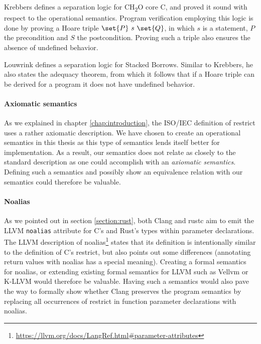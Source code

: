 Krebbers \cite{krebbers2015c} defines a separation logic for CH\textsubscript{2}O core C,
and proved it sound with respect to the operational semantics.
Program verification employing this logic is done by proving a Hoare triple $\set{P} \ s \ \set{Q}$,
in which $s$ is a statement, $P$ the precondition and $S$ the postcondition.
Proving such a triple also ensures the absence of undefined behavior.


Louwrink \cite{louwrink2021separation} defines a separation logic for Stacked Borrows. 
Similar to Krebbers, he also states the adequacy theorem, from which it follows that if a Hoare triple can be derived
for a program it does not have undefined behavior.

\paragraph{Axiomatic semantics} As we explained in chapter \ref{chap:introduction}, the
ISO/IEC definition of restrict uses a rather axiomatic description.
We have chosen to create an operational semantics in this thesis as this type of semantics
lends itself better for implementation.
As a result, our semantics does not relate as closely to the standard description as
one could accomplish with an \textit{axiomatic semantics}.
Defining such a semantics and possibly show an equivalence relation with our semantics could therefore
be valuable.

\paragraph{Noalias} As we pointed out in section \ref{section:rust}, both Clang and rustc
aim to emit the LLVM \texttt{noalias} attribute for C's  and Rust's  types
within parameter declarations.
The LLVM description of noalias\footnote{\url{https://llvm.org/docs/LangRef.html\#parameter-attributes}} states that 
its definition is intentionally similar to the definition of C's restrict, but also points out some differences
(\eg annotating return values with noalias has a special meaning).  
Creating a formal semantics for noalias, or extending existing formal semantics for LLVM such as
Vellvm \cite{zhao2012formalizing} or K-LLVM \cite{li2020k} would therefore be valuable.
Having such a semantics would also pave the way to formally show whether Clang preserves
the program semantics by replacing all occurrences of restrict in function parameter declarations with noalias.
